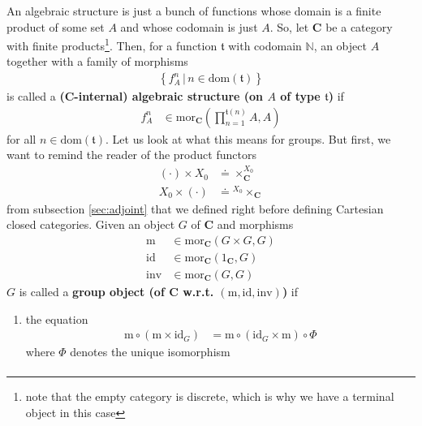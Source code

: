 \begin{exa}
\begin{enumerate}
An algebraic structure is just a bunch of functions whose domain is a finite product of some set $A$ and whose codomain is just $A$.
So, let $\mathbf{C}$ be a category with finite products\footnote{note that the empty category is discrete, which is why we have a terminal object in this case}.
Then, for a function $\mathfrak{t}$ with codomain $\mathbb{N}$, an object $A$ together with a family of morphisms
\begin{align*}
  \left\lbrace
      f_{A}^{n}
    \,
    \vert
    \,
      n
      \in
      \mathrm{dom}(\mathfrak{t})
  \right\rbrace
\end{align*}
is called a \textbf{($\mathbf{C}$-internal) algebraic structure (on $A$ of type $\mathfrak{t}$)} if
\begin{align*}
  f_{A}^{n}
  &\in
  \mathrm{mor}_{\mathbf{C}}
  \left(
    \prod_{n=1}^{\mathfrak{t}(n)}A,
    A
  \right)
\end{align*}
for all $n \in \mathrm{dom}(\mathfrak{t})$.
Let us look at what this means for groups.
But first, we want to remind the reader of the product functors
\begin{align*}
  (\cdot)
  \times
  X_{0}
  &\doteq
  \times_{\mathbf{C}}^{X_{0}}
  \\
  X_{0}
  \times
  (\cdot)
  &\doteq
  {}^{X_{0}}\times_{\mathbf{C}}
\end{align*}
from subsection \ref{sec:adjoint} that we defined right before defining Cartesian closed categories.
Given an object $G$ of $\mathbf{C}$ and morphisms
\begin{align*}
  \mathrm{m}
  &\in
  \mathrm{mor}_{\mathbf{C}}
  \left(
    G
    \times
    G,
    G
  \right)
  \\
  \mathrm{id}
  &\in
  \mathrm{mor}_{\mathbf{C}}
  \left(
    1_{\mathbf{C}},
    G
  \right)
  \\
  \mathrm{inv}
  &\in
  \mathrm{mor}_{\mathbf{C}}
  \left(
    G,
    G
  \right)
\end{align*}
$G$ is called a \textbf{group object (of $\mathbf{C}$ w.r.t.
$(\mathrm{m},\mathrm{id},\mathrm{inv})$)} if
\begin{enumerate}
\item[(GO1)]
the equation
\begin{align*}
  \mathrm{m}
  \circ
  \left(
    \mathrm{m}
    \times
    \mathrm{id}_{G}
  \right)
  &=
  \mathrm{m}
  \circ
  \left(
    \mathrm{id}_{G}
    \times
    \mathrm{m}
  \right)
  \circ
  \Phi
\end{align*}
where $\Phi$ denotes the unique isomorphism
\begin{align*}

\end{align*}
\end{enumerate}
\end{enumerate}
\end{exa}
